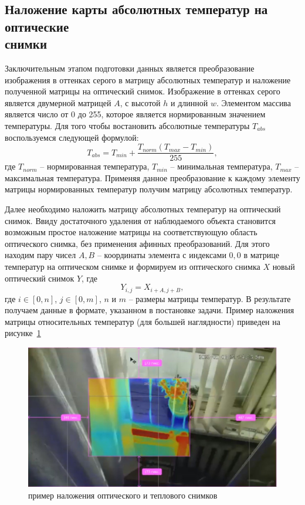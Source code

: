 \documentclass[14pt, a4paper]{extreport}
\begin{document}
\subsection[\vspace*{-0.22cm}Наложение карты абсолютных температур на оптические \\ \hspace*{-1.15cm}снимки]{Наложение карты абсолютных температур на оптические \\ снимки}	
	Заключительным этапом подготовки данных является преобразование изображения в оттенках серого в матрицу абсолютных температур и наложение полученной матрицы на оптический снимок. Изображение в оттенках серого является двумерной матрицей $A$, с высотой $h$ и длинной $w$. Элементом массива является число от 0 до 255, которое является нормированным значением температуры. Для того чтобы востановить абсолютные температуры $T_{abs}$ воспользуемся следующей формулой:
	\begin{equation*}
		T_{abs} = T_{min} + \frac{T_{norm}(T_{max} - T_{min})}{255},
		\label{eq:T_abs}
	\end{equation*}
	где $T_{norm}$ -- нормированная температура, $T_{min}$ -- минимальная температура, $T_{max}$ -- максимальная температура. Применяя данное преобразование к каждому элементу матрицы нормированных температур получим матрицу абсолютных температур.
	
	Далее необходимо наложить матрицу абсолютных температур на оптический снимок. Ввиду достаточного удаления от наблюдаемого объекта становится возможным простое наложение матрицы на соответствующую область оптического снимка, без применения афинных преобразований.
	Для этого находим пару чисел $A, B$ -- координаты элемента с индексами $0, 0$ в матрице температур на оптическом снимке и формируем из оптического снимка $X$ новый оптический снимок $Y$, где
	\begin{equation*}
		Y_{i,j} = X_{i + A,j + B},
		\label{eq:nalozhenie}
	\end{equation*}
	где $i \in [0, n]$, $j \in [0, m]$, $n$ и $m$ -- размеры матрицы температур. В результате получаем данные в формате, указанном в постановке задачи. Пример наложения матрицы относительных температур (для большей наглядности) приведен на рисунке~\ref{fig:nalozhenie}
	\begin{figure}[h!]
		\centering
		\includegraphics[width = 13cm]{image/chapter_2/nalozhenie}	
		\caption{пример наложения оптического и теплового снимков}
		\label{fig:nalozhenie}
	\end{figure}
\end{document}
